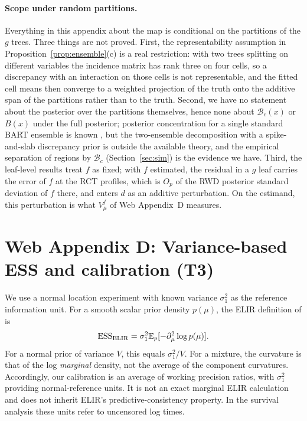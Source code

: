 \paragraph{Scope under random partitions.}
Everything in this appendix about the map is conditional on the partitions of the $g$ trees. Three things are not proved. First, the representability assumption in Proposition~\ref{prop:ensemble}(c) is a real restriction: with two trees splitting on different variables the incidence matrix has rank three on four cells, so a discrepancy with an interaction on those cells is not representable, and the fitted cell means then converge to a weighted projection of the truth onto the additive span of the partitions rather than to the truth. Second, we have no statement about the posterior over the partitions themselves, hence none about $\mathcal B_c(x)$ or $B(x)$ under the full posterior; posterior concentration for a single standard BART ensemble is known \citep{rockova2020bart}, but the two-ensemble decomposition with a spike-and-slab discrepancy prior is outside the available theory, and the empirical separation of regions by $\mathcal B_c$ (Section~\ref{sec:sim}) is the evidence we have. Third, the leaf-level results treat $f$ as fixed; with $f$ estimated, the residual in a $g$ leaf carries the error of $f$ at the RCT profiles, which is $O_p$ of the RWD posterior standard deviation of $f$ there, and enters $d$ as an additive perturbation. On the estimand, this perturbation is what $V^f_\mu$ of Web Appendix~D measures.

\section*{Web Appendix D: Variance-based ESS and calibration (T3)}

We use a normal location experiment with known variance $\sigma_1^2$ as the reference information unit. For a smooth scalar prior density $p(\mu)$, the ELIR definition of \citet{neuenschwander2020} is
\[
\mathrm{ESS}_{\rm ELIR}=\sigma_1^2\mathbb{E}_p[-\partial_\mu^2\log p(\mu)].
\]
For a normal prior of variance $V$, this equals $\sigma_1^2/V$. For a mixture, the curvature is that of the log \emph{marginal} density, not the average of the component curvatures. Accordingly, our calibration is an average of working precision ratios, with $\sigma_1^2$ providing normal-reference units. It is not an exact marginal ELIR calculation and does not inherit ELIR's predictive-consistency property. In the survival analysis these units refer to uncensored log times.

